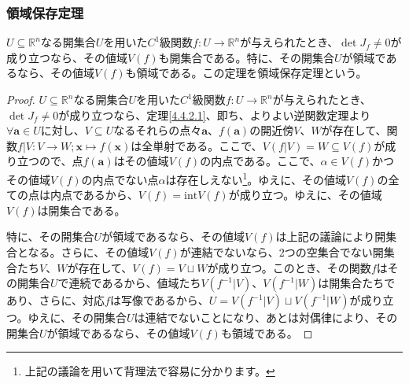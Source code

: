 \documentclass[dvipdfmx]{jsarticle}
\begin{document}
\subsubsection{領域保存定理}%
\begin{thm}[領域保存定理]\label{4.4.2.4}
$U \subseteq \mathbb{R}^{n}$なる開集合$U$を用いた$C^{1}$級関数$f:U \rightarrow \mathbb{R}^{n}$が与えられたとき、$\det J_{f} \neq 0$が成り立つなら、その値域$V(f)$も開集合である。特に、その開集合$U$が領域であるなら、その値域$V(f)$も領域である。この定理を領域保存定理という。
\end{thm}
\begin{proof}
$U \subseteq \mathbb{R}^{n}$なる開集合$U$を用いた$C^{1}$級関数$f:U \rightarrow \mathbb{R}^{n}$が与えられたとき、$\det J_{f} \neq 0$が成り立つなら、定理\ref{4.4.2.1}、即ち、よりよい逆関数定理より$\forall\mathbf{a} \in U$に対し、$V \subseteq U$なるそれらの点々$\mathbf{a}$、$f\left( \mathbf{a} \right)$の開近傍$V$、$W$が存在して、関数$f|V:V \rightarrow W;\mathbf{x} \mapsto f\left( \mathbf{x} \right)$は全単射である。ここで、$V\left( f|V \right) = W \subseteq V(f)$が成り立つので、点$f\left( \mathbf{a} \right)$はその値域$V(f)$の内点である。ここで、$\alpha \in V(f)$かつその値域$V(f)$の内点でない点$\alpha$は存在しえない\footnote{上記の議論を用いて背理法で容易に分かります。}。ゆえに、その値域$V(f)$の全ての点は内点であるから、$V(f) = \mathrm{int}{V(f)}$が成り立つ。ゆえに、その値域$V(f)$は開集合である。\par
特に、その開集合$U$が領域であるなら、その値域$V(f)$は上記の議論により開集合となる。さらに、その値域$V(f)$が連結でないなら、2つの空集合でない開集合たち$V$、$W$が存在して、$V(f) = V \sqcup W$が成り立つ。このとき、その関数$f$はその開集合$U$で連続であるから、値域たち$V\left( f^{- 1}|V \right)$、$V\left( f^{- 1}|W \right)$は開集合たちであり、さらに、対応$f$は写像であるから、$U = V\left( f^{- 1}|V \right) \sqcup V\left( f^{- 1}|W \right)$が成り立つ。ゆえに、その開集合$U$は連結でないことになり、あとは対偶律により、その開集合$U$が領域であるなら、その値域$V(f)$も領域である。
\end{proof}
\end{document}
